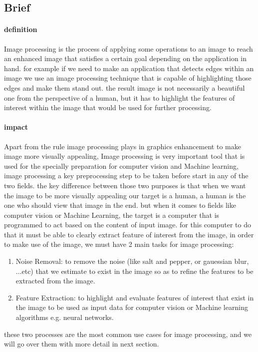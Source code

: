 \subsection{Brief}
\paragraph{definition}
Image processing is the process of applying some operations to an image to reach an enhanced image
that satisfies a certain goal depending on the application in hand.
for example if we need to make an application that detects edges within an image we use an image processing
technique that is capable of highlighting those edges and make them stand out.
the result image is not necessarily a beautiful one from the perspective of a human, but it has to highlight
the features of interest within the image that would be used for further processing.

\paragraph{impact}
Apart from the rule image processing plays in graphics enhancement to make image more visually appealing,
Image processing is very important tool that is used for the specially preparation for computer vision and Machine learning, image processing a key preprocessing step to be taken before start in any of the two fields.
the key difference between those two purposes is that when we want the image to be more visually appealing
our target is a human, a human is the one who should view that image in the end.
but when it comes to fields like computer vision or Machine Learning, the target is a computer that is programmed 
to act based on the content of input image.
for this computer to do that it must be able to clearly extract feature of interest from the image, 
in order to make use of the image, we must have 2 main tasks for image processing:
\begin{enumerate}
	\item Noise Removal: to remove the noise (like salt and pepper, or gauessian blur, ...etc) that we estimate to exist in the image so as to refine the features to be extracted from the image.
	
	\item Feature Extraction: to highlight and evaluate features of interest that exist in the image to be used
	as input data for computer vision or Machine learning algorithms e.g. neural networks.
\end{enumerate}
these two processes are the most common use cases for image processing, and we will go over them with more detail in next section.


